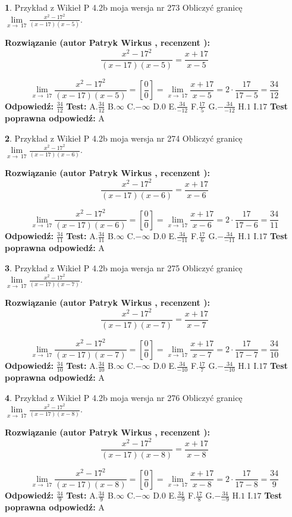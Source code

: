 \documentclass[12pt, a4paper]{article}
\theoremstyle{definition} %
\newtheorem{zad}{}
\newcommand{\zadStart}[1]{\begin{zad}#1\newline}
\newcommand{\zadStop}{\end{zad}}
\newcommand{\rozwStart}[2]{\noindent \textbf{Rozwiązanie (autor #1 , recenzent #2): }\newline}
\newcommand{\rozwStop}{\newline}
\newcommand{\odpStart}{\noindent \textbf{Odpowiedź:}\newline}
\newcommand{\odpStop}{\newline}
\newcommand{\testStart}{\noindent \textbf{Test:}\newline}
\newcommand{\testStop}{\newline}
\newcommand{\kluczStart}{\noindent \textbf{Test poprawna odpowiedź:}\newline}
\newcommand{\kluczStop}{\newline}
\begin{document}
\zadStart{Przykład z Wikieł P 4.2b moja wersja nr 273}
Obliczyć granicę $\lim\limits_{x\to\ 17}\frac{x^{2}-17^{2}}{(x-17)(x-5)}$.
\zadStop
\rozwStart{Patryk Wirkus}{}
$$\frac{x^{2}-17^{2}}{(x-17)(x-5)}=\frac{x+17}{x-5}$$

$$\lim\limits_{x\to\ 17}\frac{x^{2}-17^{2}}{(x-17)(x-5)}=[\frac{0}{0}]=\lim\limits_{x\to\ 17}\frac{x+17}{x-5}=2 \cdot \frac{17}{17-5} = \frac{34}{12}$$
\rozwStop
\odpStart
$\frac{34}{12}$
\odpStop
\testStart
A.$\frac{34}{12}$
B.$\infty$
C.$-\infty$
D.$0$
E.$\frac{34}{-12}$
F.$\frac{17}{5}$
G.$-\frac{34}{-12}$
H.$1$
I.$17$
\testStop
\kluczStart
A
\kluczStop



\zadStart{Przykład z Wikieł P 4.2b moja wersja nr 274}
Obliczyć granicę $\lim\limits_{x\to\ 17}\frac{x^{2}-17^{2}}{(x-17)(x-6)}$.
\zadStop
\rozwStart{Patryk Wirkus}{}
$$\frac{x^{2}-17^{2}}{(x-17)(x-6)}=\frac{x+17}{x-6}$$

$$\lim\limits_{x\to\ 17}\frac{x^{2}-17^{2}}{(x-17)(x-6)}=[\frac{0}{0}]=\lim\limits_{x\to\ 17}\frac{x+17}{x-6}=2 \cdot \frac{17}{17-6} = \frac{34}{11}$$
\rozwStop
\odpStart
$\frac{34}{11}$
\odpStop
\testStart
A.$\frac{34}{11}$
B.$\infty$
C.$-\infty$
D.$0$
E.$\frac{34}{-11}$
F.$\frac{17}{6}$
G.$-\frac{34}{-11}$
H.$1$
I.$17$
\testStop
\kluczStart
A
\kluczStop



\zadStart{Przykład z Wikieł P 4.2b moja wersja nr 275}
Obliczyć granicę $\lim\limits_{x\to\ 17}\frac{x^{2}-17^{2}}{(x-17)(x-7)}$.
\zadStop
\rozwStart{Patryk Wirkus}{}
$$\frac{x^{2}-17^{2}}{(x-17)(x-7)}=\frac{x+17}{x-7}$$

$$\lim\limits_{x\to\ 17}\frac{x^{2}-17^{2}}{(x-17)(x-7)}=[\frac{0}{0}]=\lim\limits_{x\to\ 17}\frac{x+17}{x-7}=2 \cdot \frac{17}{17-7} = \frac{34}{10}$$
\rozwStop
\odpStart
$\frac{34}{10}$
\odpStop
\testStart
A.$\frac{34}{10}$
B.$\infty$
C.$-\infty$
D.$0$
E.$\frac{34}{-10}$
F.$\frac{17}{7}$
G.$-\frac{34}{-10}$
H.$1$
I.$17$
\testStop
\kluczStart
A
\kluczStop



\zadStart{Przykład z Wikieł P 4.2b moja wersja nr 276}
Obliczyć granicę $\lim\limits_{x\to\ 17}\frac{x^{2}-17^{2}}{(x-17)(x-8)}$.
\zadStop
\rozwStart{Patryk Wirkus}{}
$$\frac{x^{2}-17^{2}}{(x-17)(x-8)}=\frac{x+17}{x-8}$$

$$\lim\limits_{x\to\ 17}\frac{x^{2}-17^{2}}{(x-17)(x-8)}=[\frac{0}{0}]=\lim\limits_{x\to\ 17}\frac{x+17}{x-8}=2 \cdot \frac{17}{17-8} = \frac{34}{9}$$
\rozwStop
\odpStart
$\frac{34}{9}$
\odpStop
\testStart
A.$\frac{34}{9}$
B.$\infty$
C.$-\infty$
D.$0$
E.$\frac{34}{-9}$
F.$\frac{17}{8}$
G.$-\frac{34}{-9}$
H.$1$
I.$17$
\testStop
\kluczStart
A
\kluczStop
\end{document}
